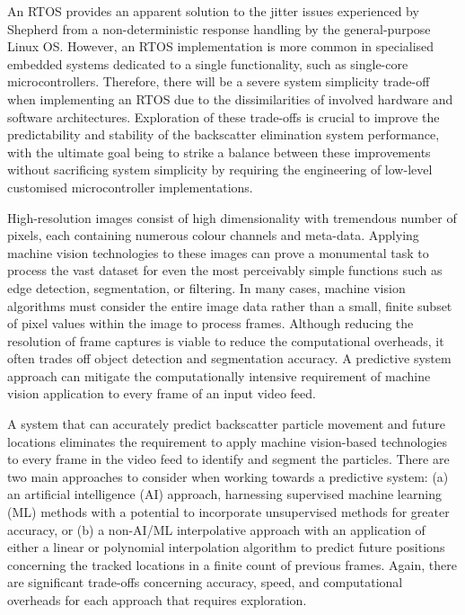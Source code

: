An RTOS provides an apparent solution to the jitter issues experienced by Shepherd \cite{katieshepherdMachineVisionBased2023} from a non-deterministic response handling by the general-purpose Linux OS. However, an RTOS implementation is more common in specialised embedded systems dedicated to a single functionality, such as single-core microcontrollers. Therefore, there will be a severe system simplicity trade-off when implementing an RTOS due to the dissimilarities of involved hardware and software architectures. Exploration of these trade-offs is crucial to improve the predictability and stability of the backscatter elimination system performance, with the ultimate goal being to strike a balance between these improvements without sacrificing system simplicity by requiring the engineering of low-level customised microcontroller implementations.

High-resolution images consist of high dimensionality with tremendous number of pixels, each containing numerous colour channels and meta-data. Applying machine vision technologies to these images can prove a monumental task to process the vast dataset for even the most perceivably simple functions such as edge detection, segmentation, or filtering. In many cases, machine vision algorithms must consider the entire image data rather than a small, finite subset of pixel values within the image to process frames. Although reducing the resolution of frame captures is viable to reduce the computational overheads, it often trades off object detection and segmentation accuracy. A predictive system approach can mitigate the computationally intensive requirement of machine vision application to every frame of an input video feed.

A system that can accurately predict backscatter particle movement and future locations eliminates the requirement to apply machine vision-based technologies to every frame in the video feed to identify and segment the particles. There are two main approaches to consider when working towards a predictive system: (a) an artificial intelligence (AI) approach, harnessing supervised machine learning (ML) methods with a potential to incorporate unsupervised methods for greater accuracy, or (b) a non-AI/ML interpolative approach with an application of either a linear or polynomial interpolation algorithm to predict future positions concerning the tracked locations in a finite count of previous frames. Again, there are significant trade-offs concerning accuracy, speed, and computational overheads for each approach that requires exploration.
